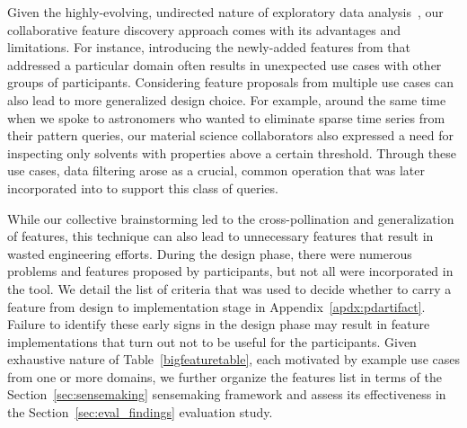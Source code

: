 {  \par Given the highly-evolving, undirected nature of exploratory data analysis~\cite{Keim2006,Tukey1970}, our collaborative feature discovery approach comes with its advantages and limitations. For instance, introducing the newly-added features from \zvpp that addressed a particular domain often results in unexpected use cases with other groups of participants. Considering feature proposals from multiple use cases can also lead to more generalized design choice. For example, around the same time when we spoke to astronomers who wanted to eliminate sparse time series from their pattern queries, our material science collaborators also expressed a need for inspecting only solvents with properties above a certain  \noindent
  threshold. Through these use cases, data filtering arose as a crucial, common operation that was later incorporated into \zvpp to support this class of queries. %
  \par While our collective brainstorming led to the cross-pollination and generalization of features, this technique can also lead to unnecessary features that result in wasted engineering efforts. During the design phase, there were numerous problems and features proposed by participants, but not all were incorporated in the tool. We detail the list of criteria that was used to decide whether to carry a feature from design to implementation stage in Appendix~\ref{apdx:pdartifact}. Failure to identify these early signs in the design phase may result in feature implementations that turn out not to be useful for the participants. Given exhaustive nature of Table~\ref{bigfeaturetable}, each motivated by example use cases from one or more domains, we further organize the features list in terms of the Section~\ref{sec:sensemaking} sensemaking framework and assess its effectiveness in the Section~\ref{sec:eval_findings} evaluation study.
}
